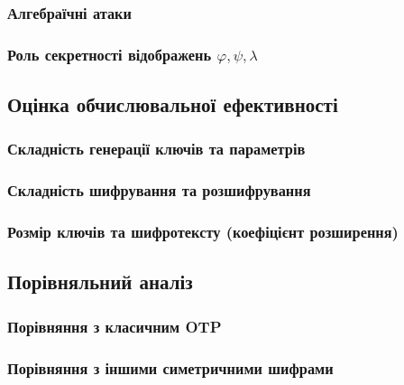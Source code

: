 \documentclass[a4paper,12pt]{article}
\begin{document}
    \subsubsection{Алгебраїчні атаки} %

    \subsubsection{Роль секретності відображень \(\varphi, \psi, \lambda\)} %

    \subsection{Оцінка обчислювальної ефективності} %

    \subsubsection{Складність генерації ключів та параметрів} %

    \subsubsection{Складність шифрування та розшифрування} %

    \subsubsection{Розмір ключів та шифротексту (коефіцієнт розширення)} %

    \subsection{Порівняльний аналіз} %

    \subsubsection{Порівняння з класичним OTP} %

    \subsubsection{Порівняння з іншими симетричними шифрами} %
\end{document}
